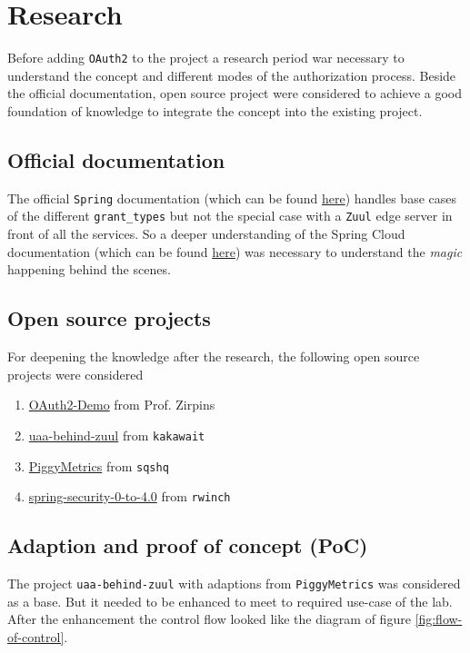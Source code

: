 \documentclass[11pt]{article}
\begin{document}
	\tableofcontents
	\newpage
	
	\section{Research}
	Before adding \texttt{OAuth2} to the project a research period war necessary to understand the concept and
	different modes of the authorization process. Beside the official documentation, open source project were
	considered to achieve a good foundation of knowledge to integrate the concept into the existing project.
	\subsection{Official documentation}	
	The official \texttt{Spring} documentation (which can be found \href{http://projects.spring.io/spring-security-oauth/docs/oauth2.html}{here}) handles base cases of the different 
	\texttt{grant\_types} but not the special case with a \texttt{Zuul} edge server in front of all the services. So a deeper understanding of the Spring Cloud documentation (which can be found \href{http://cloud.spring.io/spring-cloud-security/spring-cloud-security.html}{here}) was necessary to understand the \textit{magic} happening behind the scenes. 
	
	\subsection{Open source projects}
	For deepening the knowledge after the research, the following open source projects were considered
	\begin{enumerate}
		\item \href{https://github.com/zirpins/vsmlab/tree/master/oauth2-demo}{OAuth2-Demo} from Prof. Zirpins
		\item \href{https://github.com/kakawait/uaa-behind-zuul-sample}{uaa-behind-zuul} from \texttt{kakawait}
		\item \href{https://github.com/sqshq/PiggyMetrics/}{PiggyMetrics} from \texttt{sqshq}
		\item \href{https://github.com/rwinch/spring-security-0-to-4.0}{spring-security-0-to-4.0} from \texttt{rwinch}
	\end{enumerate}	
	
	\newpage
	\subsection{Adaption and proof of concept (PoC)}
	The project \texttt{uaa-behind-zuul} with adaptions from \texttt{PiggyMetrics} was considered as a base. But it needed to be enhanced to meet to required use-case of the lab. After the enhancement the control flow looked like the diagram of figure \ref{fig:flow-of-control}.
	
\end{document}
